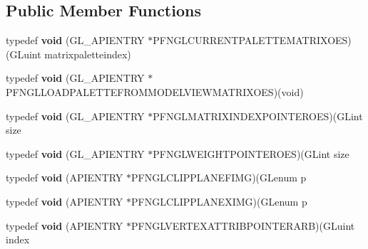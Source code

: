 \subsection*{Public Member Functions}
\begin{DoxyCompactItemize}
\item 
\hypertarget{class_c_p_v_r_tgles_ext_a171986d3ab627efafca1bfa1597d4329}{typedef {\bfseries void} (G\+L\+\_\+\+A\+P\+I\+E\+N\+T\+R\+Y $\ast$P\+F\+N\+G\+L\+C\+U\+R\+R\+E\+N\+T\+P\+A\+L\+E\+T\+T\+E\+M\+A\+T\+R\+I\+X\+O\+E\+S)(G\+Luint matrixpaletteindex)}\label{class_c_p_v_r_tgles_ext_a171986d3ab627efafca1bfa1597d4329}

\item 
\hypertarget{class_c_p_v_r_tgles_ext_aef62d838b96699cf0733a5dfba16e554}{typedef {\bfseries void} (G\+L\+\_\+\+A\+P\+I\+E\+N\+T\+R\+Y $\ast$P\+F\+N\+G\+L\+L\+O\+A\+D\+P\+A\+L\+E\+T\+T\+E\+F\+R\+O\+M\+M\+O\+D\+E\+L\+V\+I\+E\+W\+M\+A\+T\+R\+I\+X\+O\+E\+S)(void)}\label{class_c_p_v_r_tgles_ext_aef62d838b96699cf0733a5dfba16e554}

\item 
\hypertarget{class_c_p_v_r_tgles_ext_a84cbdd548b5fa2aad5d97619c3d4bb5a}{typedef {\bfseries void} (G\+L\+\_\+\+A\+P\+I\+E\+N\+T\+R\+Y $\ast$P\+F\+N\+G\+L\+M\+A\+T\+R\+I\+X\+I\+N\+D\+E\+X\+P\+O\+I\+N\+T\+E\+R\+O\+E\+S)(G\+Lint size}\label{class_c_p_v_r_tgles_ext_a84cbdd548b5fa2aad5d97619c3d4bb5a}

\item 
\hypertarget{class_c_p_v_r_tgles_ext_a18b86ac38e259cf5651d8483a9f19a1a}{typedef {\bfseries void} (G\+L\+\_\+\+A\+P\+I\+E\+N\+T\+R\+Y $\ast$P\+F\+N\+G\+L\+W\+E\+I\+G\+H\+T\+P\+O\+I\+N\+T\+E\+R\+O\+E\+S)(G\+Lint size}\label{class_c_p_v_r_tgles_ext_a18b86ac38e259cf5651d8483a9f19a1a}

\item 
\hypertarget{class_c_p_v_r_tgles_ext_aa29af839c37ca5f3f6bc51f664d18610}{typedef {\bfseries void} (A\+P\+I\+E\+N\+T\+R\+Y $\ast$P\+F\+N\+G\+L\+C\+L\+I\+P\+P\+L\+A\+N\+E\+F\+I\+M\+G)(G\+Lenum p}\label{class_c_p_v_r_tgles_ext_aa29af839c37ca5f3f6bc51f664d18610}

\item 
\hypertarget{class_c_p_v_r_tgles_ext_a72a4da33f0baa375f1f137c9ec88135b}{typedef {\bfseries void} (A\+P\+I\+E\+N\+T\+R\+Y $\ast$P\+F\+N\+G\+L\+C\+L\+I\+P\+P\+L\+A\+N\+E\+X\+I\+M\+G)(G\+Lenum p}\label{class_c_p_v_r_tgles_ext_a72a4da33f0baa375f1f137c9ec88135b}

\item 
\hypertarget{class_c_p_v_r_tgles_ext_ade9e54cdb0715799254f61e23e299f54}{typedef {\bfseries void} (A\+P\+I\+E\+N\+T\+R\+Y $\ast$P\+F\+N\+G\+L\+V\+E\+R\+T\+E\+X\+A\+T\+T\+R\+I\+B\+P\+O\+I\+N\+T\+E\+R\+A\+R\+B)(G\+Luint index}\label{class_c_p_v_r_tgles_ext_ade9e54cdb0715799254f61e23e299f54}


\end{DoxyCompactItemize}
